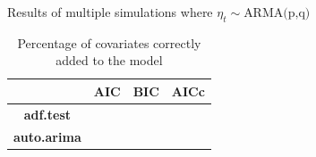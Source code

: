 \documentclass[10pt]{beamer}
\begin{document}
\begin{frame}{Results of multiple simulations where $\eta_t\sim\text{ARMA(p,q)}$}

    \begin{table}
        \centering\small 
        \label{simulations1}
        \caption{Percentage of covariates correctly added to the model}
        \begin{tabular}{|c|ccc|}
            \toprule 
                                    & \textbf{AIC}  & \textbf{BIC}  & \textbf{AICc}   \\
            \midrule
            \textbf{adf.test}   &                                                     \\
            \textbf{auto.arima} &                                                     \\
            \bottomrule
        \end{tabular}

    \end{table}

    
    
\end{frame}
\end{document}
